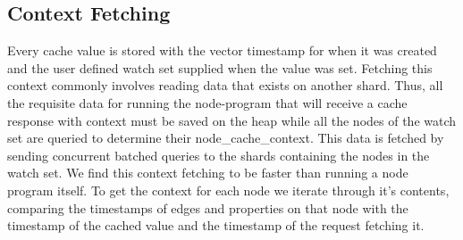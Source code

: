 \documentclass[letterpaper,twocolumn,11pt,tight]{article}
\begin{document}
\subsection{Context Fetching}
Every cache value is stored with the vector timestamp for when it was created and the user defined watch set supplied when the value was set. Fetching this context commonly involves reading data that exists on another shard. Thus, all the requisite data for running the node-program that will receive a cache response with context must be saved on the heap while all the nodes of the watch set are queried to determine their node\_cache\_context.
This data is fetched by sending concurrent batched queries to the shards containing the nodes in the watch set. We find this context fetching to be faster than running a node program itself. To get the context for each node we iterate through it's contents, comparing the timestamps of edges and properties on that node with the timestamp of the cached value and the timestamp of the request fetching it. %
\end{document}
